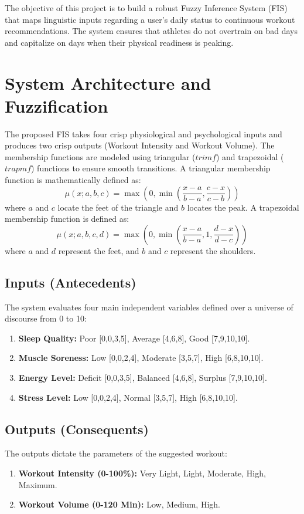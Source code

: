 \documentclass[conference]{IEEEtran}
\begin{document}
The objective of this project is to build a robust Fuzzy Inference System (FIS) that maps linguistic inputs regarding a user's daily status to continuous workout recommendations. The system ensures that athletes do not overtrain on bad days and capitalize on days when their physical readiness is peaking.

\section{System Architecture and Fuzzification}
The proposed FIS takes four crisp physiological and psychological inputs and produces two crisp outputs (Workout Intensity and Workout Volume). The membership functions are modeled using triangular ($trimf$) and trapezoidal ($trapmf$) functions to ensure smooth transitions. A triangular membership function is mathematically defined as:
\begin{equation}
\mu(x; a, b, c) = \max\left(0, \min\left(\frac{x-a}{b-a}, \frac{c-x}{c-b}\right)\right)
\end{equation}
where $a$ and $c$ locate the feet of the triangle and $b$ locates the peak. A trapezoidal membership function is defined as:
\begin{equation}
\mu(x; a, b, c, d) = \max\left(0, \min\left(\frac{x-a}{b-a}, 1, \frac{d-x}{d-c}\right)\right)
\end{equation}
where $a$ and $d$ represent the feet, and $b$ and $c$ represent the shoulders.

\subsection{Inputs (Antecedents)}
The system evaluates four main independent variables defined over a universe of discourse from 0 to 10:
\begin{enumerate}
    \item \textbf{Sleep Quality:} Poor [0,0,3,5], Average [4,6,8], Good [7,9,10,10].
    \item \textbf{Muscle Soreness:} Low [0,0,2,4], Moderate [3,5,7], High [6,8,10,10].
    \item \textbf{Energy Level:} Deficit [0,0,3,5], Balanced [4,6,8], Surplus [7,9,10,10].
    \item \textbf{Stress Level:} Low [0,0,2,4], Normal [3,5,7], High [6,8,10,10].
\end{enumerate}

\subsection{Outputs (Consequents)}
The outputs dictate the parameters of the suggested workout:
\begin{enumerate}
    \item \textbf{Workout Intensity (0-100\%):} Very Light, Light, Moderate, High, Maximum.
    \item \textbf{Workout Volume (0-120 Min):} Low, Medium, High.
\end{enumerate}
\end{document}
